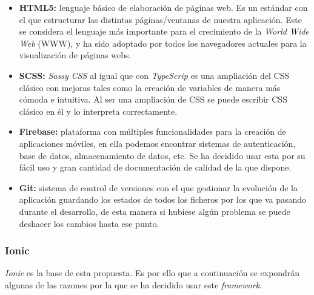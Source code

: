 \begin{itemize}
    \item\textbf{HTML5:} lenguaje básico de elaboración de páginas web. Es un estándar con el que
    estructurar las distintas páginas/ventanas de nuestra aplicación. Este se considera el lenguaje
    más importante para el crecimiento de la \textit{World Wide Web} (WWW), y ha sido adoptado por
    todos los navegadores actuales para la visualización de páginas webs.
    \item\textbf{SCSS:} \textit{Sassy CSS} al igual que con \textit{TypeScrip} es una ampliación del
    CSS clásico con mejoras tales como la creación de variables de manera más cómoda e intuitiva.
    Al ser una ampliación de CSS se puede escribir CSS clásico en él y lo interpreta correctamente.
    \item\textbf{Firebase:} plataforma con múltiples funcionalidades para la creación de aplicaciones
    móviles, en ella podemos encontrar sistemas de autenticación, base de datos, almacenamiento de
    datos, etc. Se ha decidido usar esta por su fácil uso y gran cantidad de documentación de calidad
    de la que dispone.
    \item\textbf{Git:} sistema de control de versiones con el que gestionar la evolución de la
    aplicación guardando los estados de todos los ficheros por los que va pasando durante el
    desarrollo, de esta manera si hubiese algún problema se puede deshacer los cambios hasta ese
    punto.
\end{itemize}

\subsubsection{Ionic}
\textit{Ionic} es la base de esta propuesta. Es por ello que a continuación se expondrán algunas
de las razones por la que se ha decidido usar este \textit{framework}.

